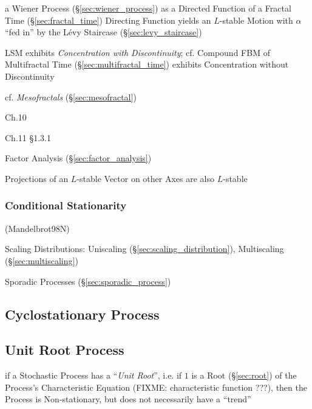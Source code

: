 a Wiener Process (\S\ref{sec:wiener_process}) as a Directed Function of a
Fractal Time (\S\ref{sec:fractal_time}) Directing Function yields an $L$-stable
Motion with $\alpha$ ``fed in'' by the L\'evy Staircase
(\S\ref{sec:levy_staircase})

LSM exhibits \emph{Concentration with Discontinuity}; cf. Compound FBM of
Multifractal Time (\S\ref{sec:multifractal_time}) exhibits Concentration without
Discontinuity

cf. \emph{Mesofractals} (\S\ref{sec:mesofractal})

Ch.10

Ch.11 \S 1.3.1

Factor Analysis (\S\ref{sec:factor_analysis})

Projections of an $L$-stable Vector on other Axes are also $L$-stable



\subsubsection{Conditional Stationarity}\label{sec:conditional_stationarity}

(Mandelbrot98N)

\fist Scaling Distributions: Uniscaling
(\S\ref{sec:scaling_distribution}), Multiscaling (\S\ref{sec:multiscaling})

\fist Sporadic Processes (\S\ref{sec:sporadic_process})



\subsection{Cyclostationary Process}\label{sec:cyclostationary_process}

\subsection{Unit Root Process}\label{sec:unit_root}

if a Stochastic Process has a ``\emph{Unit Root}'', i.e. if $1$ is a Root
(\S\ref{sec:root}) of the Process's Characteristic Equation (FIXME:
characteristic function ???), then the Process is Non-stationary, but does not
necessarily have a ``trend''

